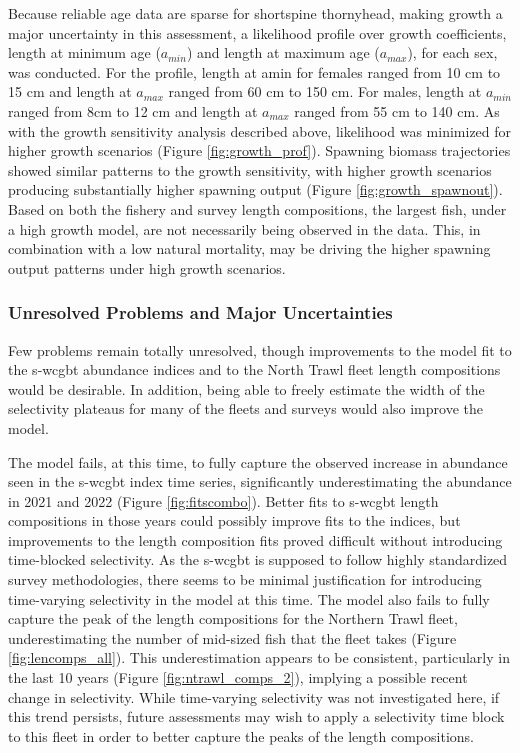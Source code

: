 \documentclass[11pt,
  english,
  letterpaper,
]{article}
\begin{document}
Because reliable age data are sparse for shortspine thornyhead, making growth a major uncertainty in this assessment, a likelihood profile over growth coefficients, length at minimum age (\(a_{min}\)) and length at maximum age (\(a_{max}\)), for each sex, was conducted. For the profile, length at amin for females ranged from 10 cm to 15 cm and length at \(a_{max}\) ranged from 60 cm to 150 cm. For males, length at \(a_{min}\) ranged from 8cm to 12 cm and length at \(a_{max}\) ranged from 55 cm to 140 cm. As with the growth sensitivity analysis described above, likelihood was minimized for higher growth scenarios (Figure \ref{fig:growth_prof}). Spawning biomass trajectories showed similar patterns to the growth sensitivity, with higher growth scenarios producing substantially higher spawning output (Figure \ref{fig:growth_spawnout}). Based on both the fishery and survey length compositions, the largest fish, under a high growth model, are not necessarily being observed in the data. This, in combination with a low natural mortality, may be driving the higher spawning output patterns under high growth scenarios.

\hypertarget{unresolved-problems-and-major-uncertainties-1}{%
\subsubsection{Unresolved Problems and Major Uncertainties}\label{unresolved-problems-and-major-uncertainties-1}}

Few problems remain totally unresolved, though improvements to the model fit to the \gls{s-wcgbt} abundance indices and to the North Trawl fleet length compositions would be desirable. In addition, being able to freely estimate the width of the selectivity plateaus for many of the fleets and surveys would also improve the model.

The model fails, at this time, to fully capture the observed increase in abundance seen in the \gls{s-wcgbt} index time series, significantly underestimating the abundance in 2021 and 2022 (Figure \ref{fig:fitscombo}). Better fits to \gls{s-wcgbt} length compositions in those years could possibly improve fits to the indices, but improvements to the length composition fits proved difficult without introducing time-blocked selectivity. As the \gls{s-wcgbt} is supposed to follow highly standardized survey methodologies, there seems to be minimal justification for introducing time-varying selectivity in the model at this time. The model also fails to fully capture the peak of the length compositions for the Northern Trawl fleet, underestimating the number of mid-sized fish that the fleet takes (Figure \ref{fig:lencomps_all}). This underestimation appears to be consistent, particularly in the last 10 years (Figure \ref{fig:ntrawl_comps_2}), implying a possible recent change in selectivity. While time-varying selectivity was not investigated here, if this trend persists, future assessments may wish to apply a selectivity time block to this fleet in order to better capture the peaks of the length compositions.
\end{document}
